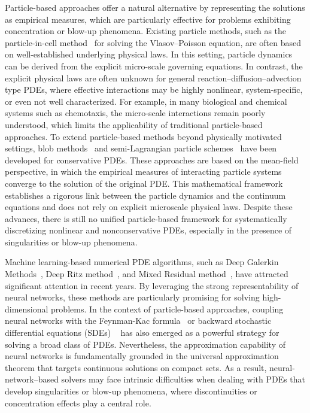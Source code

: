\documentclass[preprint,12pt]{elsarticle}
\theoremstyle{definition}
\theoremstyle{remark}
\begin{document}
Particle-based approaches offer a natural alternative by representing the solutions as empirical measures, which are particularly effective for problems exhibiting concentration or blow-up phenomena. 
Existing particle methods, such as the particle-in-cell method~\cite{birdsall2018plasma, hockney2021computer} for solving the Vlasov--Poisson equation, are often based on well-established  underlying physical laws. In this setting, particle dynamics can be derived from the explicit micro-scale governing equations. In contrast, the explicit physical laws are often unknown for general reaction–diffusion–advection type PDEs, where effective interactions may be highly nonlinear, system-specific, or even not well characterized. For example, in many biological and chemical systems such as chemotaxis, the micro-scale interactions remain poorly understood, which limits the applicability of traditional particle-based approaches.
To extend particle-based methods beyond physically motivated settings, blob methods~\cite{craig2016blob,carrillo2019blob,huang2017error} and semi-Lagrangian particle schemes~\cite{qiu2010conservative,qiu2011conservative,qiu2011positivity} have been developed for conservative PDEs.
These approaches are based on the mean-field perspective, in which the empirical measures of interacting particle systems converge to the solution of the original PDE. This mathematical framework establishes a rigorous link between the particle dynamics and the continuum equations and does not rely on explicit microscale physical laws. Despite these advances, there is still no unified particle-based framework for systematically discretizing nonlinear and nonconservative PDEs, especially in the presence of singularities or blow-up phenomena.

Machine learning-based numerical PDE algorithms, such as Deep Galerkin Methods~\cite{sirignano2018dgm}, Deep Ritz method~\cite{yu2018deep}, and Mixed Residual method~\cite{lyu2022mim}, have attracted significant attention in recent years. By leveraging the strong representability of neural networks, these methods are particularly promising for solving high-dimensional problems. In the context of particle-based approaches, coupling neural networks with the Feynman-Kac formula~\cite{han2024deep, hutzenthaler2021speed, nguwi2024deep,beck2021deep} or backward stochastic differential equations (SDEs) ~\cite{han2017deep, han2018solving, hure2020deep} has also emerged as a powerful strategy for solving a broad class of PDEs. Nevertheless, the approximation capability of neural networks is fundamentally grounded in the universal approximation theorem that targets continuous solutions on compact sets.
As a result, neural-network–based solvers may face intrinsic difficulties when dealing with PDEs that develop singularities or blow-up phenomena, where discontinuities or concentration effects play a central role.
\end{document}
